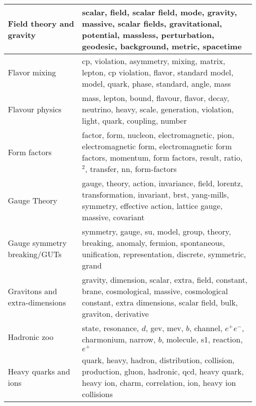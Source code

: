 \begin{longtable}[H]{p{}|p{}}
Field theory and gravity                            &                                              scalar, field, scalar field, mode, gravity, massive, scalar fields, gravitational, potential, massless, perturbation, geodesic, background, metric, spacetime \\ \midrule
Flavor mixing                                       &                                                                         cp, violation, asymmetry, mixing, matrix, lepton, cp violation, flavor, standard model, model, quark, phase, standard, angle, mass \\ \midrule
Flavour physics                                     &                                                                                 mass, lepton, bound, flavour, flavor, decay, neutrino, heavy, scale, generation, violation, light, quark, coupling, number \\ \midrule
Form factors                                        &                                  factor, form, nucleon, electromagnetic, pion, electromagnetic form, electromagnetic form factors, momentum, form factors, result, ratio, $^2$, transfer, nn, form-factors \\ \midrule
Gauge Theory                                        &                                              gauge, theory, action, invariance, field, lorentz, transformation, invariant, brst, yang-mills, symmetry, effective action, lattice gauge, massive, covariant \\ \midrule
Gauge symmetry breaking/GUTs                        &                                                                symmetry, gauge, su, model, group, theory, breaking, anomaly, fermion, spontaneous, unification, representation, discrete, symmetric, grand \\ \midrule
Gravitons and extra-dimensions                      &                                        gravity, dimension, scalar, extra, field, constant, brane, cosmological, massive, cosmological constant, extra dimensions, scalar field, bulk, graviton, derivative \\ \midrule
Hadronic zoo                                        &                                                                                            state, resonance, $d$, gev, mev, $b$, channel, $e^+e^-$, charmonium, narrow, $b$, molecule, s1, reaction, $e^+$ \\ \midrule
Heavy quarks and ions                               &                                                     quark, heavy, hadron, distribution, collision, production, gluon, hadronic, qcd, heavy quark, heavy ion, charm, correlation, ion, heavy ion collisions \\ \midrule

\end{longtable}
